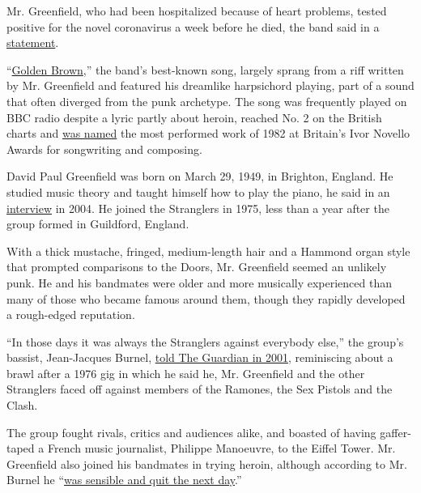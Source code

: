 Mr. Greenfield, who had been hospitalized because of heart problems,
tested positive for the novel coronavirus a week before he died, the
band said in a
\href{http://www.thestranglers.co.uk/?p=16131}{statement}.

``\href{https://www.youtube.com/watch?v=Qca9ByvLhBA}{Golden Brown},''
the band's best-known song, largely sprang from a riff written by Mr.
Greenfield and featured his dreamlike harpsichord playing, part of a
sound that often diverged from the punk archetype. The song was
frequently played on BBC radio despite a lyric partly about heroin,
reached No. 2 on the British charts and
\href{https://www.facebookcorewwwi.onion/thestranglers/posts/on-this-day-5th-may-1983-the-stranglers-golden-brown-was-named-most-performed-wo/310825798997141/}{was
named} the most performed work of 1982 at Britain's Ivor Novello Awards
for songwriting and composing.

David Paul Greenfield was born on March 29, 1949, in Brighton, England.
He studied music theory and taught himself how to play the piano, he
said in an
\href{https://books.google.gr/books?id=iI77AwAAQBAJ\&pg=PA150\&lpg=PA150\&dq=dave+greenfield+ray+manzarek\&source=bl\&ots=te-FM0K1Fb\&sig=ACfU3U2FsTjf9nAmIR-IYqC-60KKkOWkiw\&hl=en\&sa=X\&ved=2ahUKEwiD4YS6gZ_pAhVhxoUKHTqWDBw4ChDoATABegQICRAB\#v=onepage\&q=dave\%20greenfield\%20ray\%20manzarek\&f=false}{interview}
in 2004. He joined the Stranglers in 1975, less than a year after the
group formed in Guildford, England.

With a thick mustache, fringed, medium-length hair and a Hammond organ
style that prompted comparisons to the Doors, Mr. Greenfield seemed an
unlikely punk. He and his bandmates were older and more musically
experienced than many of those who became famous around them, though
they rapidly developed a rough-edged reputation.

``In those days it was always the Stranglers against everybody else,''
the group's bassist, Jean-Jacques Burnel,
\href{https://www.theguardian.com/culture/2001/aug/10/artsfeatures}{told
The Guardian in 2001}, reminiscing about a brawl after a 1976 gig in
which he said he, Mr. Greenfield and the other Stranglers faced off
against members of the Ramones, the Sex Pistols and the Clash.

The group fought rivals, critics and audiences alike, and boasted of
having gaffer-taped a French music journalist, Philippe Manoeuvre, to
the Eiffel Tower. Mr. Greenfield also joined his bandmates in trying
heroin, although according to Mr. Burnel he
``\href{https://www.theguardian.com/music/2014/mar/12/stranglers-40-years-fights-drugs-ufos}{was
sensible and quit the next day}.''

